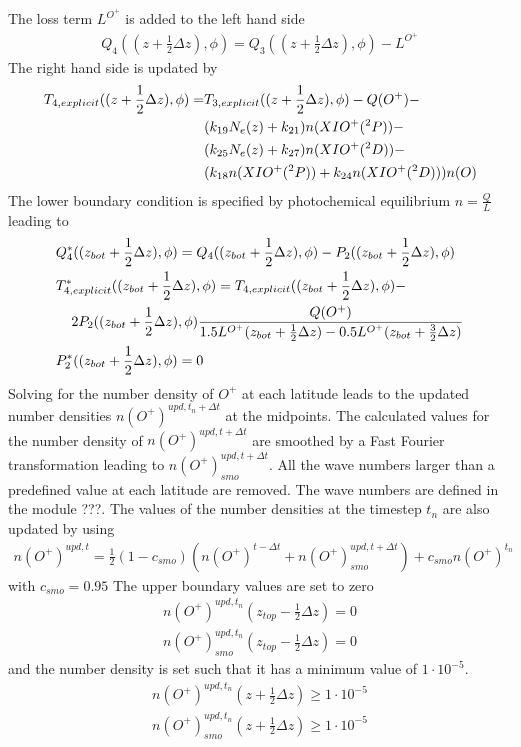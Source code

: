 %
The loss term $L^{O^+}$ is added to the left hand side
%
\begin{align}
  Q_4((z+\frac{1}{2}\Delta z),\phi) = Q_3((z+\frac{1}{2}\Delta
  z),\phi) -L^{O^+}
\end{align}
%
The right hand side is updated by
%
\begin{align}
 T_{4,explicit}((z+\frac{1}{2}\Delta z),\phi)= &
  T_{3,explicit}((z+\frac{1}{2}\Delta z),\phi) - Q(O^+)- \notag \\
  {} & (k_{19} N_e(z) + k_{21})n(XI O^+(^2P)) - \notag \\
  {} & (k_{25} N_e(z) + k_{27})n(XI O^+(^2D)) - \notag \\
  {} &  (k_{18}n(XI O^+(^2P)) + k_{24}n(XI O^+(^2D)))n(O)
\end{align}
%
The lower boundary condition is specified by photochemical
equilibrium $n = \frac{Q}{L}$ leading to
%
\begin{align}
  {} & Q_4^*((z_{bot}+\frac{1}{2}\Delta z),\phi) = Q_4((z_{bot}+\frac{1}{2}\Delta
    z),\phi) - P_2((z_{bot}+\frac{1}{2}\Delta z),\phi) \\
  {} & T_{4,explicit}^*((z_{bot}+\frac{1}{2}\Delta z),\phi)= T_{4,explicit}((z_{bot}+\frac{1}{2}\Delta
    z),\phi) - \notag \\
    {} & \; \; \; \; 2 P_2((z_{bot}+\frac{1}{2}\Delta
    z),\phi)\frac{Q(O^+)}{1.5 L^{O^+}(z_{bot}+\frac{1}{2}\Delta z)-
     0.5 L^{O^+}(z_{bot}+\frac{3}{2}\Delta
    z)} \\
  {} & P_2^*((z_{bot}+\frac{1}{2}\Delta z),\phi) = 0
\end{align}
%
%
Solving for the number density of $O^+$ at each latitude leads to
the updated number densities $n(O^+)^{upd, t_n+\Delta t}$ at the
midpoints. The calculated values for the number density of
$n(O^+)^{upd, t + \Delta t}$ are smoothed by a Fast Fourier
transformation leading to $n(O^+)_{smo}^{upd,t+\Delta t}$. All the
wave numbers larger than a predefined value at each latitude are
removed. The wave numbers are defined in the module ???.
The values of the number densities at the timestep $t_n$ are also
updated by using
%
\begin{align}
  n(O^+)^{upd,t} = \frac{1}{2}({1-c_{smo}})(n(O^+)^{t-\Delta t}+
     n(O^+)_{smo}^{upd,t+\Delta t}) + c_{smo}n(O^+)^{t_n}
\end{align}
%
with $c_{smo} = 0.95$ The upper boundary values are set to zero
%
\begin{align}
 n(O^+)^{upd,t_n}(z_{top}-\frac{1}{2}\Delta z) = 0 \\
 n(O^+)_{smo}^{upd,t_n}(z_{top}-\frac{1}{2}\Delta z) = 0
\end{align}
%
and the number density is set such that it has a minimum value of
$1\cdot 10^{-5}$.
%
\begin{align}
 n(O^+)^{upd,t_n}(z+\frac{1}{2}\Delta z) \geq  1\cdot 10^{-5}\\
 n(O^+)_{smo}^{upd,t_n}(z+\frac{1}{2}\Delta z) \geq 1\cdot 10^{-5}
\end{align}
%
